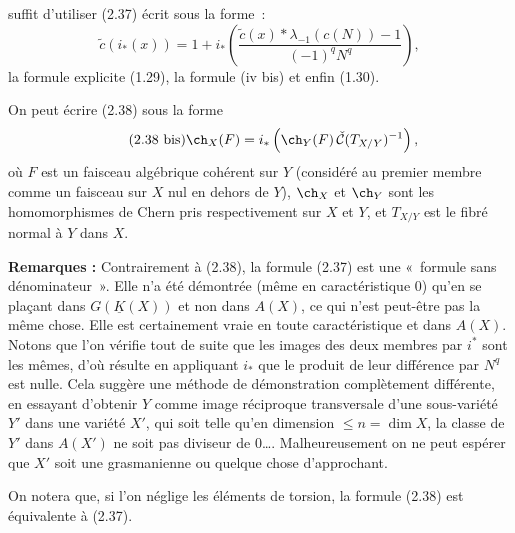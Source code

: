 suffit d'utiliser (2.37) écrit sous la forme~:
\begin{equation}\tag{2.37 bis}
 \widetilde c(i_*(x))=1+i_*\left(\frac{\widetilde c(x)*\lambda_{-1}(c(N))-1}{(-1)^qN^q}\right),
\end{equation}
la formule explicite (1.29), la formule (iv bis) et enfin (1.30).

On peut écrire (2.38) sous la forme
\begin{equation}\tag{2.38 bis}
 \ch_X(F)=i_*\left(\ch_Y(F)\,\check{\mathcal C}(T_{X/Y})^{-1}\right),
\end{equation}
où $F$ est un faisceau algébrique cohérent sur $Y$ (considéré au premier membre comme un faisceau sur $X$ nul en dehors de $Y$), $\ch_X$ et $\ch_Y$ sont les homomorphismes de Chern pris respectivement sur $X$ et $Y$, et $T_{X/Y}$ est le fibré normal à $Y$ dans $X$.

\textbf{Remarques :} Contrairement à (2.38), la formule (2.37) est une «~formule sans dénominateur~». Elle n'a été démontrée (même en caractéristique $0$) qu'en se plaçant dans $G(\underline K(X))$ et non dans $A(X)$, ce qui n'est peut-être pas la même chose. Elle est certainement vraie en toute caractéristique et dans $A(X)$. Notons que l'on vérifie tout de suite que les images des deux membres par $i^*$ sont les mêmes, d'où résulte en appliquant $i_*$ que le produit de leur différence par $N^q$ est nulle. Cela suggère une méthode de démonstration complètement différente, en essayant d'obtenir $Y$ comme image réciproque transversale d'une sous-variété $Y'$ dans une variété $X'$, qui soit telle qu'en dimension $\leq n=\dim X$, la classe de $Y'$ dans $A(X')$ ne soit pas diviseur de $0$\dots. Malheureusement on ne peut espérer que $X'$ soit une grasmanienne ou quelque chose d'approchant.

On notera que, si l'on néglige les éléments de torsion, la formule (2.38) est équivalente à (2.37).




\providecommand{\cS}{\mathcal S}
\providecommand{\cD}{\mathcal D}
\providecommand{\cE}{\mathscr E}
\providecommand{\cG}{\mathscr G}
\providecommand{\cL}{\mathscr L}
\providecommand{\cM}{\mathscr M}
\providecommand{\cP}{\mathscr P}
\providecommand{\cK}{\mathcal K}
\providecommand{\Db}{\mathrm D}
\providecommand{\Kb}{\mathrm K}
\providecommand{\Trc}{\operatorname{Tr}}
\providecommand{\ob}{\operatorname{ob}}
\providecommand{\Coh}{\operatorname{Coh}}
\providecommand{\Cone}{\operatorname{Cone}}
\providecommand{\im}{\operatorname{Im}}
\providecommand{\Id}{\operatorname{Id}}
\providecommand{\RR}{\mathrm{R.R.}}
\providecommand{\RRR}{\mathrm{R.R.R.}}
\providecommand{\GrR}{\mathrm{G}}
\providecommand{\pr}{\operatorname{pr}}


